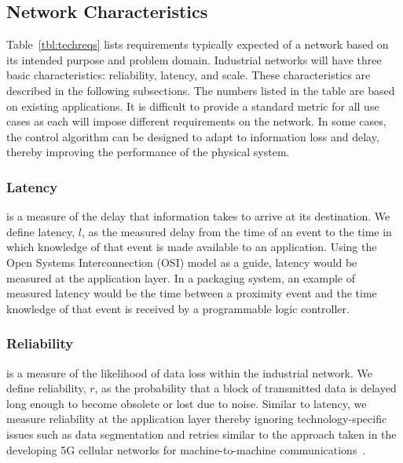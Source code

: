     
    \subsection{Network Characteristics}
    
Table~\ref{tbl:techreqs} lists requirements typically expected of a network based on its intended purpose and problem domain.  Industrial networks will have three basic characteristics: reliability, latency, and scale.  These characteristics are described in the following subsections.  The numbers listed in the table are based on existing applications.  It is difficult to provide a standard metric for all use cases as each will impose different requirements on the network.  In some cases, the control algorithm can be designed to adapt to information loss and delay, thereby improving the performance of the physical system.

	\subsubsection{Latency} is a measure of the delay that information takes to arrive at its destination.  We define latency, $l$, as the measured delay from the time of an event to the time in which knowledge of that event is made available to an application. Using the Open Systems Interconnection (OSI) model as a guide, latency would be measured at the application layer.  In a packaging system, an example of measured latency would be the time between a proximity event and the time knowledge of that event is received by a programmable logic controller. 
    
    \subsubsection{Reliability} is a measure of the likelihood of data loss within the industrial network.  We define reliability, $r$, as the probability that a block of transmitted data is delayed long enough to become obsolete or lost due to noise.  Similar to latency, we measure reliability at the application layer thereby ignoring technology-specific issues such as data segmentation and retries similar to the approach taken in the developing 5G cellular networks for machine-to-machine communications~\cite{Holfeld2016}.
    

